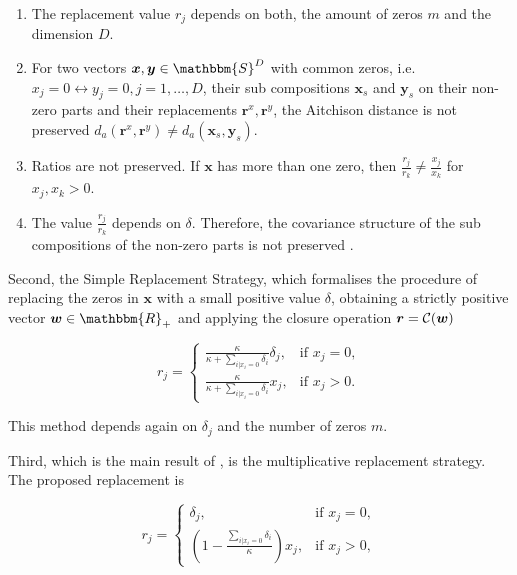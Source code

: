 \begin{enumerate}
	\item The replacement value $r_j$ depends on both, the amount of zeros $m$ and the dimension $D$.
	\item For two vectors $\bm{x},\bm{y} \in \mathbbm{S}^D$ with common zeros, i.e. $x_j= 0 \leftrightarrow y_j=0, j=1,\ldots,D$, their sub compositions $\bm{x}_s$ and $\bm{y}_s$  on their non-zero parts and their replacements $\bm{r}^x,\bm{r}^y$, the Aitchison distance is not preserved $d_a(\bm{r}^x,\bm{r}^y) \neq d_a(\bm{x}_s,\bm{y}_s)$. 
	\item Ratios are not preserved. If $\bm{x}$ has more than one zero, then $\frac{r_j}{r_k} \neq \frac{x_j}{x_k}$ for $x_j,x_k > 0$.
	\item The value $\frac{r_j}{r_k}$ depends on $\delta$. Therefore, the covariance structure of the sub compositions of the non-zero parts is not preserved \cite{Josep:2003}.
\end{enumerate}

Second, the Simple Replacement Strategy, which formalises the procedure of replacing the zeros in $\bm{x}$ with a small positive value $\delta$, obtaining a strictly positive vector $\bm{w} \in \mathbbm{R}_+$ and applying the closure operation $\bm{r}=\mathcal{C}(\bm{w})$

\begin{equation}
r_j = 
\begin{cases}
\frac{\kappa}{\kappa + \sum_{i| x_i=0}\delta_i } \delta_j, & \text{if } x_j=0, \\
\frac{\kappa}{\kappa + \sum_{i| x_i=0}\delta_i } x_j, & \text{if } x_j>0.
\end{cases}
\label{eq:simple replacement strategy}
\end{equation}

This method depends again on $\delta_j$ and the number of zeros $m$. 

Third, which is the main result of \cite{Josep:2003}, is the multiplicative replacement strategy. The proposed replacement is 

\begin{equation}
r_j = 
\begin{cases}
\delta_j, & \text{if } x_j=0, \\
\left( 1- \frac{\sum_{i | x_i=0}\delta_i}{\kappa} \right)x_j, & \text{if } x_j>0, 
\end{cases}
\label{eq:multiplicative replacement strategy}
\end{equation}

